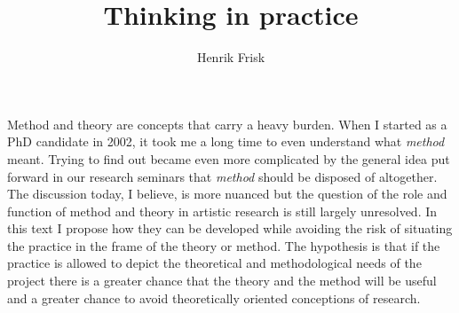 \documentclass[12pt]{article}
\begin{document}
\title{Thinking in practice}
\author{Henrik Frisk}
\date{}

\maketitle


\onehalfspacing
\noindent

Method and theory are concepts that carry a heavy burden.  When I started as a PhD candidate in 2002, it took me a long time to even understand what \emph{method} meant. Trying to find out became even more complicated by the general idea put forward in our research seminars that \emph{method} should be disposed of altogether. The discussion today, I believe, is more nuanced but the question of the role and function of method and theory in artistic research is still largely unresolved. In this text I propose how they can be developed while avoiding the risk of situating the practice in the frame of the theory or method. The hypothesis is that if the practice is allowed to depict the theoretical and methodological needs of the project there is a greater chance that the theory and the method will be useful and a greater chance to avoid theoretically oriented conceptions of research.
\end{document}
